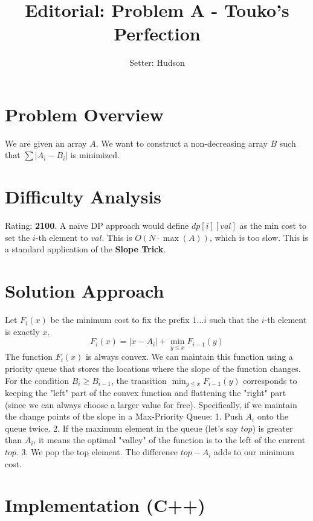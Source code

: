 \documentclass[11pt]{article}
\title{\textbf{Editorial: Problem A - Touko's Perfection}}
\author{Setter: Hudson}
\date{}
\begin{document}
\maketitle

\section*{Problem Overview}
We are given an array $A$. We want to construct a non-decreasing array $B$ such that $\sum |A_i - B_i|$ is minimized.

\section*{Difficulty Analysis}
Rating: \textbf{2100}.
A naive DP approach would define $dp[i][val]$ as the min cost to set the $i$-th element to $val$. This is $O(N \cdot \max(A))$, which is too slow.
This is a standard application of the \textbf{Slope Trick}.

\section*{Solution Approach}
Let $F_i(x)$ be the minimum cost to fix the prefix $1 \dots i$ such that the $i$-th element is exactly $x$.
$$ F_i(x) = |x - A_i| + \min_{y \le x} F_{i-1}(y) $$
The function $F_i(x)$ is always convex. We can maintain this function using a priority queue that stores the locations where the slope of the function changes.
For the condition $B_i \ge B_{i-1}$, the transition $\min_{y \le x} F_{i-1}(y)$ corresponds to keeping the "left" part of the convex function and flattening the "right" part (since we can always choose a larger value for free).
Specifically, if we maintain the change points of the slope in a Max-Priority Queue:
1. Push $A_i$ onto the queue twice.
2. If the maximum element in the queue (let's say $top$) is greater than $A_i$, it means the optimal "valley" of the function is to the left of the current $top$.
3. We pop the top element. The difference $top - A_i$ adds to our minimum cost.

\section*{Implementation (C++)}
\end{document}

